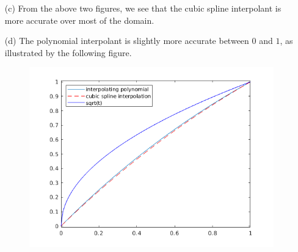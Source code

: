 \begin{sol}
\begin{multicols}{2}
\begin{itemize}
  \item[(c)]
    From the above two figures,
    we see that the cubic spline interpolant is more accurate over most of the domain.

  \item[(d)]
    The polynomial interpolant is slightly more accurate between $0$ and $1$,
    as illustrated by the following figure.
    \begin{figure}[H]
      \centering
      \includegraphics[scale=0.48]{png/interp2.png}
    \end{figure}
  \end{itemize}    
\end{multicols}
\end{sol}

